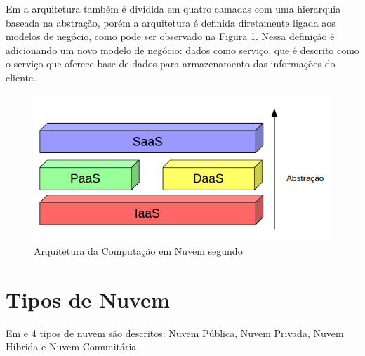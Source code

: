 Em \citep{demystifingCloud:2011} a arquitetura também é dividida em quatro camadas com uma hierarquia baseada na abstração, porém a arquitetura é definida diretamente ligada aos modelos de negócio, como pode ser observado na Figura \ref{architecture2}. Nessa definição é adicionando um novo modelo de negócio: dados como serviço, que é descrito como o serviço que oferece base de dados para armazenamento das informações do cliente. 

\begin{figure}[htbp]
  \centering \includegraphics[scale=.6]{imgs/architecture2.png}
\caption{Arquitetura da Computação em Nuvem segundo \citep{demystifingCloud:2011}} 
\label{architecture2}
\end{figure}

\section{Tipos de Nuvem} \label{cloud:types}

	Em \citep{stateOfArt:2010} e \cite{NIST:2011} 4 tipos de nuvem são descritos: Nuvem Pública, Nuvem Privada, Nuvem Híbrida e Nuvem Comunitária.

